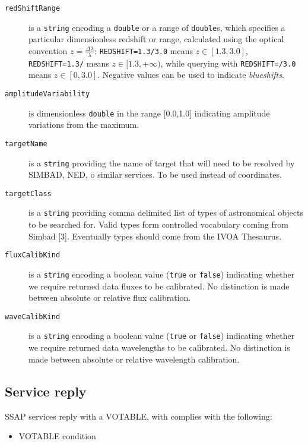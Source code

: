 \begin{description}
		\item[\texttt{redShiftRange}] is a \texttt{string} encoding
        a \texttt{double} or a range of \texttt{double}s, which
        specifies a particular dimensionless redshift or range,
        calculated using the optical convention $z =
        \frac{\Delta\lambda}{\lambda}$: \texttt{REDSHIFT=1.3/3.0}
        means $z \in [1.3,3.0]$, \texttt{REDSHIFT=1.3/} means $z \in
        [1.3,+\infty)$, while querying with \texttt{REDSHIFT=/3.0}
        means $z \in [0,3.0]$. Negative values can be used to
        indicate \emph{blueshifts}.

		\item[\texttt{amplitudeVariability}] is dimensionless 
		\texttt{double} in the range [0.0,1.0] indicating amplitude 
		variations from the maximum.
		
		\item[\texttt{targetName}] is a \texttt{string} providing 
		the name of target that will need to be resolved by SIMBAD,
		NED, o similar services. To be used instead of coordinates.
		
		\item[\texttt{targetClass}] is a \texttt{string} providing
        comma delimited list of types of astronomical objects to be
        searched for. Valid types form controlled vocabulary coming 
		from Simbad [3]. Eventually types should come from the IVOA 
		Thesaurus.
		
		\item[\texttt{fluxCalibKind}] is a \texttt{string} encoding 
		a boolean value (\texttt{true} or \texttt{false})
		indicating whether we require returned data fluxes to be 
		calibrated. No distinction is made between absolute or 
		relative flux calibration.
		
		\item[\texttt{waveCalibKind}] is a \texttt{string} encoding 
		a boolean value (\texttt{true} or \texttt{false})
		indicating whether we require returned data wavelengths to 
		be calibrated. No distinction is made between absolute or 
		relative wavelength calibration.
	\end{description}
	
	
	
	\subsection{Service reply} %
	\label{sub:service_reply_ssap}
	SSAP services reply with a VOTABLE, with complies with the 
	following:

	\begin{itemize}
		\item VOTABLE condition
	\end{itemize}
	
	


